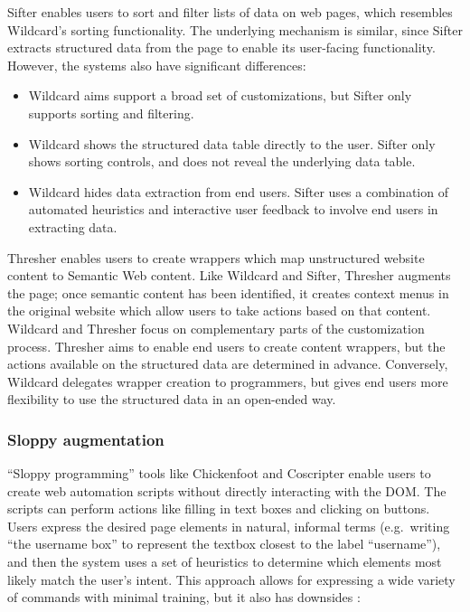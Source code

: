 \documentclass[english,submission]{programming}
\providecommand{\tightlist}{%
  \setlength{\itemsep}{0pt}\setlength{\parskip}{0pt}}
\begin{document}
Sifter \autocite{huynh2006} enables users to sort and filter lists of
data on web pages, which resembles Wildcard's sorting functionality. The
underlying mechanism is similar, since Sifter extracts structured data
from the page to enable its user-facing functionality. However, the
systems also have significant differences:

\begin{itemize}
\tightlist
\item
  Wildcard aims support a broad set of customizations, but Sifter only
  supports sorting and filtering.
\item
  Wildcard shows the structured data table directly to the user. Sifter
  only shows sorting controls, and does not reveal the underlying data
  table.
\item
  Wildcard hides data extraction from end users. Sifter uses a
  combination of automated heuristics and interactive user feedback to
  involve end users in extracting data.
\end{itemize}

Thresher \autocite{hogue2005} enables users to create wrappers which map
unstructured website content to Semantic Web content. Like Wildcard and
Sifter, Thresher augments the page; once semantic content has been
identified, it creates context menus in the original website which allow
users to take actions based on that content. Wildcard and Thresher focus
on complementary parts of the customization process. Thresher aims to
enable end users to create content wrappers, but the actions available
on the structured data are determined in advance. Conversely, Wildcard
delegates wrapper creation to programmers, but gives end users more
flexibility to use the structured data in an open-ended way.

\hypertarget{sloppy-augmentation}{%
\subsubsection{Sloppy augmentation}\label{sloppy-augmentation}}

``Sloppy programming'' \autocite{little2010} tools like Chickenfoot
\autocite{bolin2005} and Coscripter \autocite{leshed2008} enable users
to create web automation scripts without directly interacting with the
DOM. The scripts can perform actions like filling in text boxes and
clicking on buttons. Users express the desired page elements in natural,
informal terms (e.g.~writing ``the username box'' to represent the
textbox closest to the label ``username''), and then the system uses a
set of heuristics to determine which elements most likely match the
user's intent. This approach allows for expressing a wide variety of
commands with minimal training, but it also has downsides
\autocite{little2010}:
\end{document}
